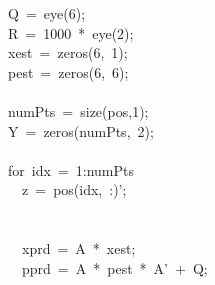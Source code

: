 \documentclass{article}\usepackage[]{graphicx}\usepackage[]{xcolor}
\makeatletter
\newcommand{\hlnum}[1]{\textcolor[rgb]{0.863,0.196,0.184}{#1}}%
\newcommand{\hlopt}[1]{\textcolor[rgb]{0.576,0.631,0.631}{#1}}%
\newcommand{\hldef}[1]{\textcolor[rgb]{0.514,0.58,0.588}{#1}}%
\newcommand{\hlkwa}[1]{\textcolor[rgb]{0.796,0.294,0.086}{#1}}%
\newenvironment{kframe}{%
 \def\at@end@of@kframe{}%
 \ifinner\ifhmode%
  \def\at@end@of@kframe{\end{minipage}}%
  \begin{minipage}{\columnwidth}%
 \fi\fi%
 \def\FrameCommand##1{\hskip\@totalleftmargin \hskip-\fboxsep
 \colorbox{shadecolor}{##1}\hskip-\fboxsep
     \hskip-\linewidth \hskip-\@totalleftmargin \hskip\columnwidth}%
 \MakeFramed {\advance\hsize-\width
   \@totalleftmargin\z@ \linewidth\hsize
   \@setminipage}}%
 {\par\unskip\endMakeFramed%
 \at@end@of@kframe}
\newenvironment{knitrout}{}{} %
\makeatother
\begin{document}
\begin{knitrout}
\begin{kframe}
\hldef{}\hldef{\ \ }\hldef{Q\ }\hlopt{=\ }\hldef{eye}\hlopt{(}\hldef{}\hlnum{6}\hldef{}\hlopt{);}\hspace*{\fill}\\
\hldef{}\hldef{\ \ }\hldef{R\ }\hlopt{=\ }\hldef{}\hlnum{1000\ }\hldef{}\hlopt{{*}\ }\hldef{eye}\hlopt{(}\hldef{}\hlnum{2}\hldef{}\hlopt{);}\hspace*{\fill}\\
\hldef{}\hldef{\ \ }\hldef{x\textunderscore est\ }\hlopt{=\ }\hldef{zeros}\hlopt{(}\hldef{}\hlnum{6}\hldef{}\hlopt{,\ }\hldef{}\hlnum{1}\hldef{}\hlopt{);}\hspace*{\fill}\\
\hldef{}\hldef{\ \ }\hldef{p\textunderscore est\ }\hlopt{=\ }\hldef{zeros}\hlopt{(}\hldef{}\hlnum{6}\hldef{}\hlopt{,\ }\hldef{}\hlnum{6}\hldef{}\hlopt{);}\hspace*{\fill}\\
\hldef{}\hspace*{\fill}\\
\hldef{}\hldef{\ \ }\hldef{numPts\ }\hlopt{=\ }\hldef{}\hlkwa{size}\hldef{}\hlopt{(}\hldef{pos}\hlopt{,}\hldef{}\hlnum{1}\hldef{}\hlopt{);}\hspace*{\fill}\\
\hldef{}\hldef{\ \ }\hldef{Y\ }\hlopt{=\ }\hldef{zeros}\hlopt{(}\hldef{numPts}\hlopt{,\ }\hldef{}\hlnum{2}\hldef{}\hlopt{);}\hspace*{\fill}\\
\hldef{}\hspace*{\fill}\\
\hldef{}\hldef{\ \ }\hldef{}\hlkwa{for\ }\hldef{idx\ }\hlopt{=\ }\hldef{}\hlnum{1}\hldef{}\hlopt{:}\hldef{numPts}\hspace*{\fill}\\
\hldef{}\hldef{\ \ \ \ }\hldef{z\ }\hlopt{=\ }\hldef{pos}\hlopt{(}\hldef{idx}\hlopt{,\ :)}\hldef{'}\hlopt{;}\hspace*{\fill}\\
\hldef{}\hspace*{\fill}\\
\hldef{}\hldef{\ \ \ \ }\hldef{}\hspace*{\fill}\\
\hldef{}\hldef{\ \ \ \ }\hldef{x\textunderscore prd\ }\hlopt{=\ }\hldef{A\ }\hlopt{{*}\ }\hldef{x\textunderscore est}\hlopt{;}\hspace*{\fill}\\
\hldef{}\hldef{\ \ \ \ }\hldef{p\textunderscore prd\ }\hlopt{=\ }\hldef{A\ }\hlopt{{*}\ }\hldef{p\textunderscore est\ }\hlopt{{*}\ }\hldef{A'\ }\hlopt{+\ }\hldef{Q}\hlopt{;}\hspace*{\fill}\\

\end{kframe}
\end{knitrout}
\end{document}
